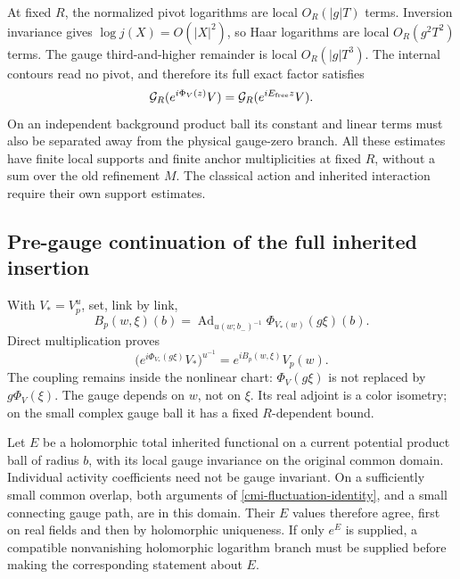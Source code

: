 At fixed $R$, the normalized pivot logarithms are local
$O_R(|g|T)$ terms. Inversion invariance gives
$\log j(X)=O(|X|^2)$, so Haar logarithms are local
$O_R(g^2T^2)$ terms. The gauge third-and-higher remainder
is local $O_R(|g|T^3)$. The internal contours read no pivot,
and therefore its full exact factor satisfies
\begin{equation}\label{cmi-gauge-retained}
 \mathcal G_R(e^{i\Phi_V(z)}V)
       =\mathcal G_R(e^{iE_{\rm free}z}V).
\end{equation}
On an independent background product ball its constant
and linear terms must also be separated away from the
physical gauge-zero branch. All these estimates have
finite local supports and finite anchor multiplicities
at fixed $R$, without a sum over the old refinement $M$.
The classical action and inherited interaction require
their own support estimates.

\subsection{Pre-gauge continuation of the full inherited insertion}
\label{cmi-continuation-section}

With $V_*=V_p^u$, set, link by link,
\begin{equation}\label{cmi-prefluctuation}
 B_p(w,\xi)(b)=
   \operatorname{Ad}_{u(w;b_-)^{-1}}
                  \Phi_{V_*(w)}(g\xi)(b).
\end{equation}
Direct multiplication proves
\begin{equation}\label{cmi-fluctuation-identity}
 \bigl(e^{i\Phi_{V_*}(g\xi)}V_*\bigr)^{u^{-1}}
             =e^{iB_p(w,\xi)}V_p(w).
\end{equation}
The coupling remains inside the nonlinear chart:
$\Phi_V(g\xi)$ is not replaced by $g\Phi_V(\xi)$.
The gauge depends on $w$, not on $\xi$. Its real adjoint
is a color isometry; on the small complex gauge ball it
has a fixed $R$-dependent bound.

Let $E$ be a holomorphic total inherited functional on a
current potential product ball of radius $b$, with its
local gauge invariance on the original common domain.
Individual activity coefficients need not be gauge invariant.
On a sufficiently small common overlap, both arguments of
\eqref{cmi-fluctuation-identity}, and a small connecting
gauge path, are in this domain. Their $E$ values therefore
agree, first on real fields and then by holomorphic uniqueness.
If only $e^E$ is supplied, a compatible nonvanishing
holomorphic logarithm branch must be supplied before making
the corresponding statement about $E$.

